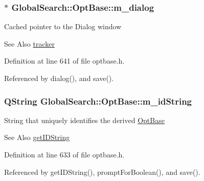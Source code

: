 \hypertarget{classGlobalSearch_1_1OptBase_a4673e81b57e648320474bf3024906161}{
\subsubsection[{m\-\_\-dialog}]{$\ast$ Global\-Search\-::\-Opt\-Base\-::m\-\_\-dialog\hspace{0.3cm}{\ttfamily [protected]}}}\label{classGlobalSearch_1_1OptBase_a4673e81b57e648320474bf3024906161}
Cached pointer to the Dialog window \begin{DoxySeeAlso}{See Also}
\hyperlink{classGlobalSearch_1_1OptBase_a304d0d10064bd3913c8089aca76067d6}{tracker} 
\end{DoxySeeAlso}


Definition at line 641 of file optbase.\-h.



Referenced by dialog(), and save().

\hypertarget{classGlobalSearch_1_1OptBase_af9223062bbb616246d5bf60ad29e1c7d}{
\subsubsection[{m\-\_\-id\-String}]{\setlength{\rightskip}{0pt plus 5cm}Q\-String Global\-Search\-::\-Opt\-Base\-::m\-\_\-id\-String\hspace{0.3cm}{\ttfamily [protected]}}}\label{classGlobalSearch_1_1OptBase_af9223062bbb616246d5bf60ad29e1c7d}
String that uniquely identifies the derived \hyperlink{classGlobalSearch_1_1OptBase}{Opt\-Base} \begin{DoxySeeAlso}{See Also}
\hyperlink{classGlobalSearch_1_1OptBase_ae4223191dd58c47e186bbdf07f99ef1c}{get\-I\-D\-String} 
\end{DoxySeeAlso}


Definition at line 633 of file optbase.\-h.



Referenced by get\-I\-D\-String(), prompt\-For\-Boolean(), and save().

